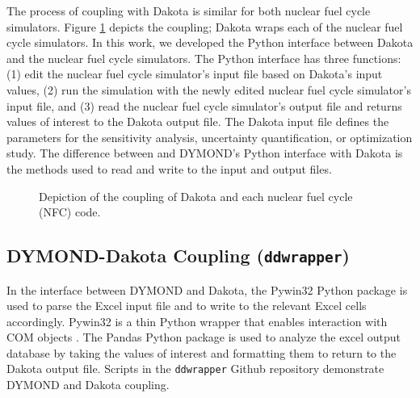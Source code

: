 The process of coupling with Dakota is similar 
for both nuclear fuel cycle simulators. 
Figure \ref{fig:dakota-NFC-flow} depicts the coupling; 
Dakota wraps each of the nuclear fuel cycle simulators.
In this work, we developed the Python interface between 
Dakota and the nuclear fuel cycle simulators.
The Python interface has three functions: 
(1) edit the nuclear fuel cycle simulator's input file based on Dakota's input values, 
(2) run the simulation with the newly edited nuclear fuel cycle simulator's input file, and 
(3) read the nuclear fuel cycle simulator's output file and returns values of interest 
to the Dakota output file. 
The Dakota input file defines the parameters for the sensitivity analysis, 
uncertainty quantification, or optimization study.
The difference between \Cyclus and DYMOND's Python interface with Dakota is the
methods used to read and write to the input and output files. 

\begin{figure}[]
    \centering
    \caption{Depiction of the coupling of Dakota and each nuclear fuel cycle (NFC) code.}
    \label{fig:dakota-NFC-flow}
\end{figure}

\subsection{DYMOND-Dakota Coupling (\texttt{ddwrapper})}
In the interface between DYMOND and Dakota, the Pywin32 
\cite{hammond_python_2000}
Python package is used to parse the Excel input file and to 
write to the relevant Excel cells accordingly. 
Pywin32 is a thin Python wrapper that enables interaction 
with COM objects \cite{hammond_python_2000}. 
The Pandas \cite{mckinney_pandas:_2011} Python
package is used to analyze the excel output database 
by taking the values of interest and formatting them 
to return to the Dakota output file.
Scripts in the \texttt{ddwrapper} Github repository \cite{chee_gwenchee/ddwrapper_2019}
demonstrate DYMOND and Dakota coupling. 

